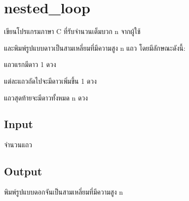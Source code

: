 \documentclass{article}
\begin{document}
\section*{nested_loop}

เขียนโปรแกรมภาษา C ที่รับจำนวนเต็มบวก n จากผู้ใช้

และพิมพ์รูปแบบดาวเป็นสามเหลี่ยมที่มีความสูง n แถว โดยมีลักษณะดังนี้:



แถวแรกมีดาว 1 ดวง



แต่ละแถวถัดไปจะมีดาวเพิ่มขึ้น 1 ดวง



แถวสุดท้ายจะมีดาวทั้งหมด n ดวง



\subsection*{Input}
จำนวนแถว



\subsection*{Output}
พิมพ์รูปแบบดอกจันเป็นสามเหลี่ยมที่มีความสูง n\\
\end{document}
